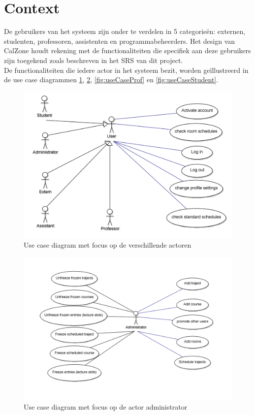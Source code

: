 \section{Context}
\label{sec:context}

De gebruikers van het systeem zijn onder te verdelen in 5 categorie\"{e}n: externen, studenten, professoren, assistenten en programmabeheerders. 
Het design van CalZone houdt rekening met de functionaliteiten die specifiek aan deze gebruikers zijn toegekend zoals beschreven in het SRS\cite{SRS} van dit project. 
\\

De functionaliteiten die iedere actor in het systeem bezit, worden ge\"{i}llustreerd in de use case diagrammen  \ref{fig:useCaseUsers}, \ref{fig:useCaseAdmin}, \ref{fig:useCaseProf} en \ref{fig:useCaseStudent}.

\begin{figure}[H]
	\centering
	\includegraphics[scale=0.2]{img/useCaseUsers}
	\caption{Use case diagram met focus op de verschillende actoren}
	\label{fig:useCaseUsers}
\end{figure}

\begin{figure}[H]
	\centering
	\includegraphics[scale=0.15]{img/useCaseAdmin}
	\caption{Use case diagram met focus op de actor administrator}
	\label{fig:useCaseAdmin}
\end{figure}

